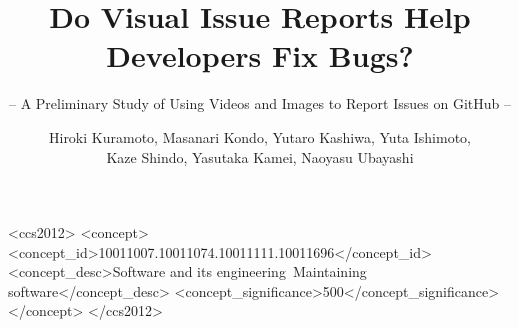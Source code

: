 \documentclass[sigconf]{acmart}
\begin{document}
\title{Do Visual Issue Reports Help Developers Fix Bugs?}
\subtitle{-- A Preliminary Study of Using Videos and Images to Report Issues on GitHub --}

\author{Hiroki Kuramoto, Masanari Kondo, Yutaro Kashiwa, Yuta Ishimoto, \\Kaze Shindo, Yasutaka Kamei, Naoyasu Ubayashi}

\newcommand{\RQone}{Do visual issue reports require less texts to report bugs than non-visual issue reports?}
\newcommand{\RQtwo}{Do visual issue reports lead to active discussions more than non-visual issue reports?}
\newcommand{\RQthree}{Do visual issue reports get resolved faster than non-visual issue reports?}

\def\summarybox#1{
\begin{tcolorbox}
    #1
\end{tcolorbox}
}


\begin{CCSXML}
<ccs2012>
<concept>
<concept_id>10011007.10011074.10011111.10011696</concept_id>
<concept_desc>Software and its engineering~Maintaining software</concept_desc>
<concept_significance>500</concept_significance>
</concept>
</ccs2012>
\end{CCSXML}




\maketitle
\end{document}
